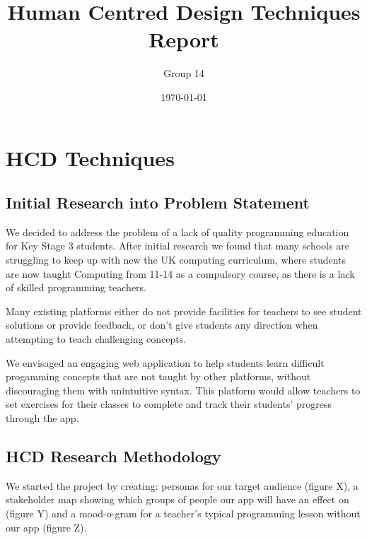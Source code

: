 \documentclass[a4wide, 11pt]{article}
\title{\vspace{-2.0cm}Human Centred Design Techniques Report}
\author{\vspace{-2.0cm}Group 14}
\date{\vspace{-2.0cm}\today}         %
\begin{document}
\maketitle            %


\section{HCD Techniques}

\subsection{Initial Research into Problem Statement}

We decided to address the problem of a lack of quality programming education for Key Stage 3 students. After initial research we found that many schools are struggling to keep up with new the UK computing curriculum, where students are now taught Computing from 11-14 as a compulsory course, as there is a lack of skilled programming teachers.

Many existing platforms either do not provide facilities for teachers to see student solutions or provide feedback, or don't give students any direction when attempting to teach challenging concepts.

We envisaged an engaging web application to help students learn difficult progamming concepts that are not taught by other platforms, without discouraging them with unintuitive syntax. This platform would allow teachers to set exercises for their classes to complete and track their students' progress through the app.

\subsection{HCD Research Methodology}

We started the project by creating: personas for our target audience (figure X), a stakeholder map showing which groups of people our app will have an effect on (figure Y) and a mood-o-gram for a teacher's typical programming lesson without our app (figure Z).
\end{document}

